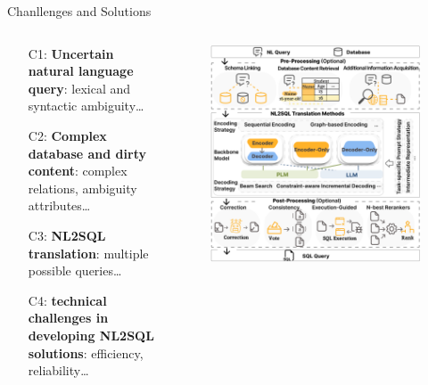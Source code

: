 \documentclass[aspectratio=169,xcolor=dvipsnames]{beamer}
\begin{document}
\begin{frame}{Chanllenges and Solutions}
    \begin{columns}[T]
        \begin{column}{0.45\textwidth}
            \begin{itemize}
                \item[C1:]\textbf{Uncertain natural language query}: lexical and syntactic ambiguity\dots
                \item[C2:]\textbf{Complex database and dirty content}: complex relations, ambiguity attributes\dots
                \item[C3:]\textbf{NL2SQL translation}: multiple possible queries\dots
                \item[C4:]\textbf{technical challenges in developing NL2SQL solutions}: efficiency, reliability\dots
            \end{itemize}
        \end{column}
        \begin{column}{0.45\textwidth}
            \begin{figure}
                \includegraphics[width=\linewidth]{assets/overview.png}
            \end{figure}
        \end{column}
    \end{columns}
\end{frame}
\end{document}
